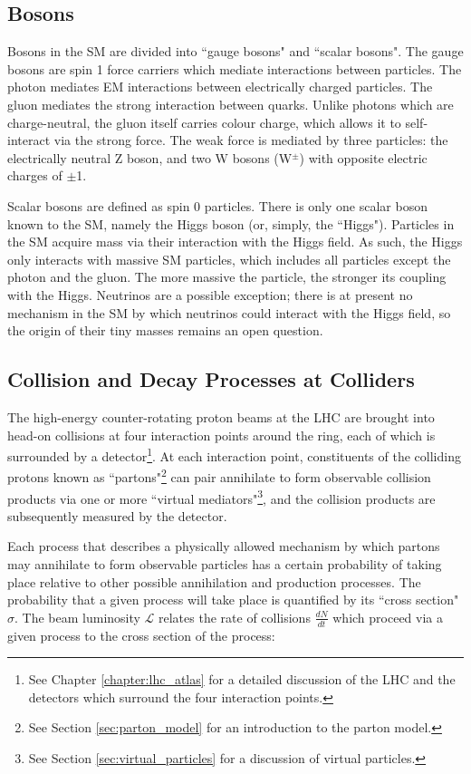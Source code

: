 \subsection{Bosons}

Bosons in the SM are divided into ``gauge bosons" and ``scalar bosons". The gauge bosons are spin 1 force carriers which mediate interactions between particles. The photon mediates EM interactions between electrically charged particles. The gluon mediates the strong interaction between quarks. Unlike photons which are charge-neutral, the gluon itself carries colour charge, which allows it to self-interact via the strong force. The weak force is mediated by three particles: the electrically neutral Z boson, and two W bosons (W$^\pm$) with opposite electric charges of $\pm$1. 

Scalar bosons are defined as spin 0 particles. There is only one scalar boson known to the SM, namely the Higgs boson (or, simply, the ``Higgs"). Particles in the SM acquire mass via their interaction with the Higgs field. As such, the Higgs only interacts with massive SM particles, which includes all particles except the photon and the gluon. The more massive the particle, the stronger its coupling with the Higgs. Neutrinos are a possible exception; there is at present no mechanism in the SM by which neutrinos could interact with the Higgs field, so the origin of their tiny masses remains an open question.  


\subsection{Collision and Decay Processes at Colliders}
\label{sec:col_decay_procs}

The high-energy counter-rotating proton beams at the LHC are brought into head-on collisions at four interaction points around the ring, each of which is surrounded by a detector\footnote{See Chapter \ref{chapter:lhc_atlas} for a detailed discussion of the LHC and the detectors which surround the four interaction points.}. At each interaction point, constituents of the colliding protons known as ``partons"\footnote{See Section \ref{sec:parton_model} for an introduction to the parton model.} can pair annihilate to form observable collision products via one or more ``virtual mediators"\footnote{See Section \ref{sec:virtual_particles} for a discussion of virtual particles.}, and the collision products are subsequently measured by the detector. 

Each process that describes a physically allowed mechanism by which partons may annihilate to form observable particles has a certain probability of taking place relative to other possible annihilation and production processes. The probability that a given process will take place is quantified by its ``cross section" \(\sigma\). The beam luminosity \(\mathcal{L}\) relates the rate of collisions \(\frac{dN}{dt}\) which proceed via a given process to the cross section of the process:

